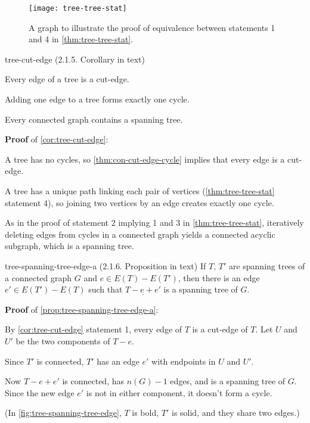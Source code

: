 \documentclass[../src/handouts/main.tex]{subfiles}
\begin{document}
\begin{figure}[htbp]
  \centering
  \texttt{[image: tree-tree-stat]}
  \caption{A graph to illustrate the proof of equivalence between statements 1 and 4 in \cref{thm:tree-tree-stat}.}
  \label{fig:tree-tree-stat}
\end{figure}

\begin{corollary}{}{tree-cut-edge}
  (2.1.5. Corollary in text)
  \begin{enumerate*}
    \item Every edge of a tree is a cut-edge.
    \item Adding one edge to a tree forms exactly one cycle.
    \item Every connected graph contains a spanning tree.
  \end{enumerate*}
\end{corollary}

\textbf{Proof} of \cref{cor:tree-cut-edge}:
\begin{enumerate*}
  \item A tree has no cycles, so \cref{thm:con-cut-edge-cycle} implies that every edge is a cut-edge.
  \item A tree has a unique path linking each pair of vertices (\cref{thm:tree-tree-stat} statement 4), so joining two vertices by an edge creates exactly one cycle.
  \item As in the proof of statement 2 implying 1 and 3 in \cref{thm:tree-tree-stat}, iteratively deleting edges from cycles in a connected graph yields a connected acyclic subgraph, which is a spanning tree.
\end{enumerate*}

\begin{proposition}{}{tree-spanning-tree-edge-a}
  (2.1.6. Proposition in text)
  If $T,\, T'$ are spanning trees of a connected graph $G$ and $e \in E(T) - E \left( T' \right)$, then there is an edge $e' \in E \left( T' \right) - E(T)$ such that $\underline{T - e + e'}$ is a spanning tree of $G$.
\end{proposition}

\textbf{Proof} of \cref{prop:tree-spanning-tree-edge-a}:
\begin{enumerate*}
  \item By \cref{cor:tree-cut-edge} statement 1, every edge of $T$ is a cut-edge of $T$. Let $U$ and $U'$ be the two components of $T - e$.
  \item Since $T'$ is connected, $T'$ has an edge $e'$ with endpoints in $U$ and $U'$.
  \item Now $T - e + e'$ is connected, has $n(G) - 1$ edges, and is a spanning tree of $G$. Since the new edge $e'$ is not in either component, it doesn't form a cycle.
  \item (In \cref{fig:tree-spanning-tree-edge}, $T$ is bold, $T'$ is solid, and they share two edges.)
\end{enumerate*}
\end{document}
